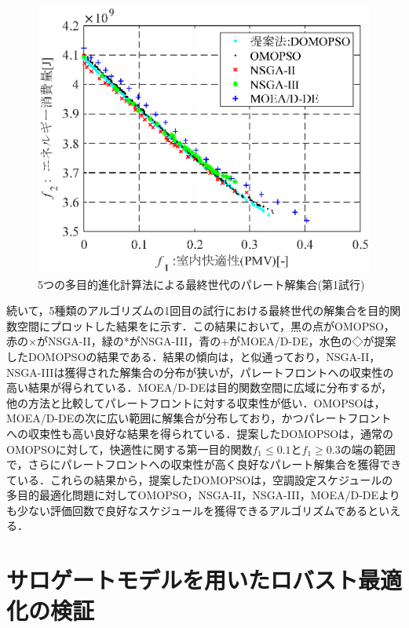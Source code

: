 \begin{figure}[htbp]
  \begin{center}
    \includegraphics[width=0.7\linewidth]{fig/surrogate_result_pareto_algorithm.eps}
  \end{center}
  \caption{5つの多目的進化計算法による最終世代のパレート解集合(第1試行)}
  \label{fig::surrogate_result_pareto_algorithm}
\end{figure}

続いて，5種類のアルゴリズムの1回目の試行における最終世代の解集合を目的関数空間にプロットした結果をに示す．この結果において，黒の点がOMOPSO，赤の×がNSGA-II，緑の*がNSGA-III，青の+がMOEA/D-DE，水色の◇が提案したDOMOPSOの結果である．結果の傾向は，と似通っており，NSGA-II，NSGA-IIIは獲得された解集合の分布が狭いが，パレートフロントへの収束性の高い結果が得られている．MOEA/D-DEは目的関数空間に広域に分布するが，他の方法と比較してパレートフロントに対する収束性が低い．OMOPSOは，MOEA/D-DEの次に広い範囲に解集合が分布しており，かつパレートフロントへの収束性も高い良好な結果を得られている．提案したDOMOPSOは，通常のOMOPSOに対して，快適性に関する第一目的関数$f_1 \leq 0.1$と$f_1 \geq 0.3$の端の範囲で，さらにパレートフロントへの収束性が高く良好なパレート解集合を獲得できている．これらの結果から，提案したDOMOPSOは，空調設定スケジュールの多目的最適化問題に対してOMOPSO，NSGA-II，NSGA-III，MOEA/D-DEよりも少ない評価回数で良好なスケジュールを獲得できるアルゴリズムであるといえる．

\section{サロゲートモデルを用いたロバスト最適化の検証}
